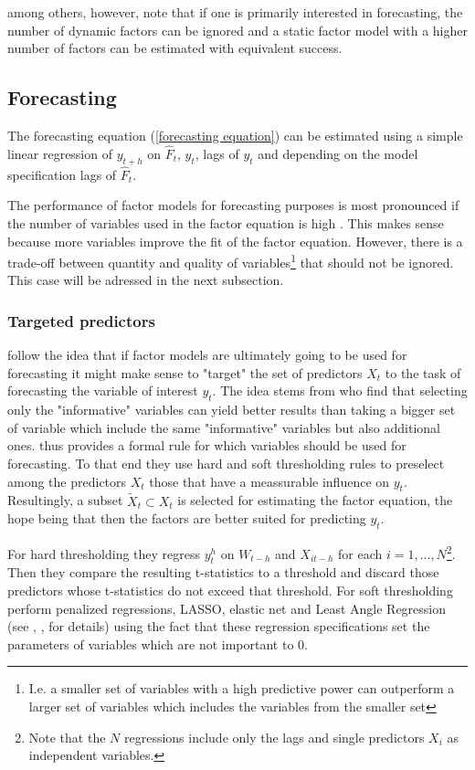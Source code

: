 \documentclass[11pt]{article}
\begin{document}
\citet{breitung2011testing} among others, however, note that if one is primarily interested in forecasting, the number of dynamic factors can be ignored and a static factor model with a higher number of factors can be estimated with equivalent success.


\subsection{Forecasting}
The forecasting equation (\ref{forecasting equation}) can be estimated using a simple linear regression of $y_{t+h}$ on $\hat F_t$, $y_t$, lags of $y_t$ and depending on the model specification lags of $\hat F_t$.

The performance of factor models for forecasting purposes is most pronounced if the number of variables used in the factor equation is high \citep{stock2011dynamic}. This makes sense because more variables improve the fit of the factor equation. However, there is a trade-off between quantity and quality of variables\footnote{I.e. a smaller set of variables with a high predictive power can outperform a larger set of variables which includes the variables from the smaller set} that should not be ignored. This case will be adressed in the next subsection.

\subsubsection{Targeted predictors}
\citet{bai2008forecasting} follow the idea that if factor models are ultimately going to be used for forecasting it might make sense to "target" the set of predictors $X_t$ to the task of forecasting the variable of interest $y_t$. The idea stems from \citet{boivin2006more} who find that selecting only the "informative" variables can yield better results than taking a bigger set of variable which include the same "informative" variables but also additional ones. \citet{bai2008forecasting} thus provides a formal rule for which variables should be used for forecasting. To that end they use hard and soft thresholding rules to preselect among the predictors $X_t$ those that have a meassurable influence on $y_t$. Resultingly, a subset $\tilde X_t \subset X_t$ is selected for estimating the factor equation, the hope being that then the factors are better suited for predicting $y_t$.

 For hard thresholding they regress $y_t^h$ on $W_{t-h}$ and $X_{it-h}$ for each $i=1, ..., N$\footnote{Note that the $N$ regressions include only the lags and single predictors $X_i$ as independent variables.}. Then they compare the resulting t-statistics to a threshold and discard those predictors whose t-statistics do not exceed that threshold. For soft thresholding \citet{bai2008forecasting} perform penalized regressions, LASSO, elastic net and Least Angle Regression (see \citet{tibshirani1996}, \citet{zou_hastie2005}, \citet{efron_hastie_johnstone_tibshirani2004} for details) using the fact that these regression specifications set the parameters of variables which are not important to $0$. \\
\end{document}
